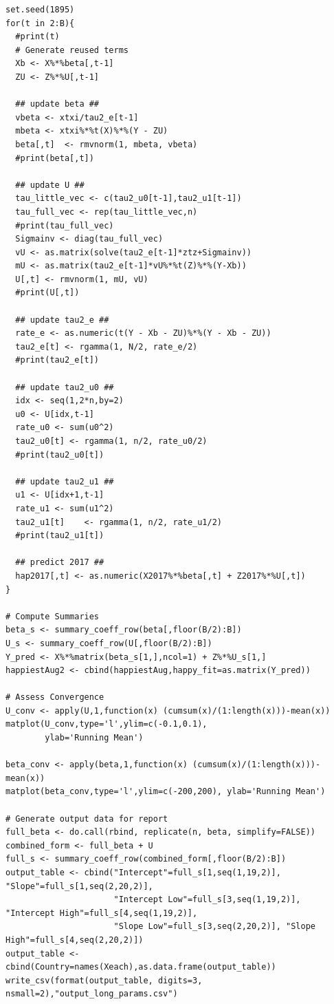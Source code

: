 \documentclass{article}
\begin{document}
\begin{verbatim}
set.seed(1895)
for(t in 2:B){
  #print(t)
  # Generate reused terms
  Xb <- X%*%beta[,t-1]
  ZU <- Z%*%U[,t-1]
  
  ## update beta ##
  vbeta	<- xtxi/tau2_e[t-1]
  mbeta	<- xtxi%*%t(X)%*%(Y - ZU)
  beta[,t]	<- rmvnorm(1, mbeta, vbeta)
  #print(beta[,t])
  
  ## update U ##
  tau_little_vec <- c(tau2_u0[t-1],tau2_u1[t-1])
  tau_full_vec <- rep(tau_little_vec,n)
  #print(tau_full_vec)
  Sigmainv <- diag(tau_full_vec)
  vU <- as.matrix(solve(tau2_e[t-1]*ztz+Sigmainv))
  mU <- as.matrix(tau2_e[t-1]*vU%*%t(Z)%*%(Y-Xb))
  U[,t]	<- rmvnorm(1, mU, vU)
  #print(U[,t])
  
  ## update tau2_e ##
  rate_e <- as.numeric(t(Y - Xb - ZU)%*%(Y - Xb - ZU))
  tau2_e[t]	<- rgamma(1, N/2, rate_e/2)
  #print(tau2_e[t])
  
  ## update tau2_u0 ##
  idx <- seq(1,2*n,by=2)
  u0 <- U[idx,t-1]
  rate_u0 <- sum(u0^2)
  tau2_u0[t] <- rgamma(1, n/2, rate_u0/2)
  #print(tau2_u0[t])
  
  ## update tau2_u1 ##
  u1 <- U[idx+1,t-1]
  rate_u1 <- sum(u1^2)
  tau2_u1[t]	<- rgamma(1, n/2, rate_u1/2)
  #print(tau2_u1[t])
  
  ## predict 2017 ##
  hap2017[,t] <- as.numeric(X2017%*%beta[,t] + Z2017%*%U[,t])
}

# Compute Summaries
beta_s <- summary_coeff_row(beta[,floor(B/2):B])
U_s <- summary_coeff_row(U[,floor(B/2):B])
Y_pred <- X%*%matrix(beta_s[1,],ncol=1) + Z%*%U_s[1,]
happiestAug2 <- cbind(happiestAug,happy_fit=as.matrix(Y_pred))

# Assess Convergence
U_conv <- apply(U,1,function(x) (cumsum(x)/(1:length(x)))-mean(x))
matplot(U_conv,type='l',ylim=c(-0.1,0.1),
        ylab='Running Mean')

beta_conv <- apply(beta,1,function(x) (cumsum(x)/(1:length(x)))-mean(x))
matplot(beta_conv,type='l',ylim=c(-200,200), ylab='Running Mean')

# Generate output data for report
full_beta <- do.call(rbind, replicate(n, beta, simplify=FALSE))
combined_form <- full_beta + U
full_s <- summary_coeff_row(combined_form[,floor(B/2):B])
output_table <- cbind("Intercept"=full_s[1,seq(1,19,2)], "Slope"=full_s[1,seq(2,20,2)],
                      "Intercept Low"=full_s[3,seq(1,19,2)], "Intercept High"=full_s[4,seq(1,19,2)],
                      "Slope Low"=full_s[3,seq(2,20,2)], "Slope High"=full_s[4,seq(2,20,2)])
output_table <- cbind(Country=names(Xeach),as.data.frame(output_table))
write_csv(format(output_table, digits=3, nsmall=2),"output_long_params.csv")


\end{verbatim}
\end{document}
